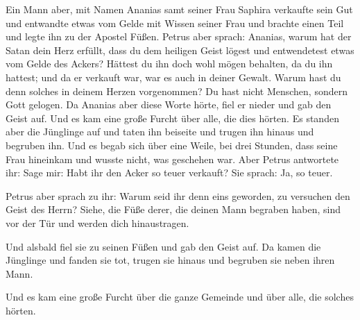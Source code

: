  Ein Mann aber, mit Namen Ananias samt seiner Frau Saphira
verkaufte sein Gut  und entwandte etwas vom Gelde mit
Wissen seiner Frau und brachte einen Teil und legte ihn zu der Apostel
Füßen.  Petrus aber sprach: Ananias, warum hat der Satan
dein Herz erfüllt, dass du dem heiligen Geist lögest und entwendetest
etwas vom Gelde des Ackers?  Hättest du ihn doch wohl
mögen behalten, da du ihn hattest; und da er verkauft war, war es auch
in deiner Gewalt. Warum hast du denn solches in deinem Herzen
vorgenommen? Du hast nicht Menschen, sondern Gott gelogen.
 Da Ananias aber diese Worte hörte, fiel er nieder und gab
den Geist auf. Und es kam eine große Furcht über alle, die dies hörten.
 Es standen aber die Jünglinge auf und taten ihn beiseite
und trugen ihn hinaus und begruben ihn.  Und es begab sich
über eine Weile, bei drei Stunden, dass seine Frau hineinkam und wusste
nicht, was geschehen war.  Aber Petrus antwortete ihr:
Sage mir: Habt ihr den Acker so teuer verkauft? Sie sprach: Ja, so
teuer.

 Petrus aber sprach zu ihr: Warum seid ihr denn eins
geworden, zu versuchen den Geist des Herrn? Siehe, die Füße derer, die
deinen Mann begraben haben, sind vor der Tür und werden dich
hinaustragen.

 Und alsbald fiel sie zu seinen Füßen und gab den Geist
auf. Da kamen die Jünglinge und fanden sie tot, trugen sie hinaus und
begruben sie neben ihren Mann.

 Und es kam eine große Furcht über die ganze Gemeinde und
über alle, die solches hörten.


